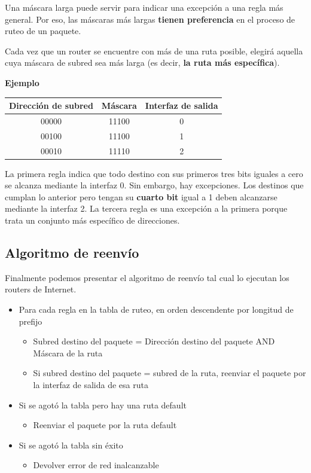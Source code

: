 \documentclass[spanish,a4paper,]{article}
\providecommand{\tightlist}{%
  \setlength{\itemsep}{0pt}\setlength{\parskip}{0pt}}
\begin{document}
Una máscara larga puede servir para indicar una excepción a una regla
más general. Por eso, las máscaras más largas \textbf{tienen
preferencia} en el proceso de ruteo de un paquete.

Cada vez que un router se encuentre con más de una ruta posible, elegirá
aquella cuya máscara de subred sea más larga (es decir, \textbf{la ruta
más específica}).

\textbf{Ejemplo}

\begin{longtable}[]{@{}ccc@{}}
\toprule
Dirección de subred & Máscara & Interfaz de salida\tabularnewline
\midrule
\endhead
00000 & 11100 & 0\tabularnewline
00100 & 11100 & 1\tabularnewline
00010 & 11110 & 2\tabularnewline
\bottomrule
\end{longtable}

La primera regla indica que todo destino con sus primeros tres bits
iguales a cero se alcanza mediante la interfaz 0. Sin embargo, hay
excepciones. Los destinos que cumplan lo anterior pero tengan su
\textbf{cuarto bit} igual a 1 deben alcanzarse mediante la interfaz 2.
La tercera regla es una excepción a la primera porque trata un conjunto
más específico de direcciones.

\hypertarget{algoritmo-de-reenvuxedo}{%
\subsection{Algoritmo de reenvío}\label{algoritmo-de-reenvuxedo}}

Finalmente podemos presentar el algoritmo de reenvío tal cual lo
ejecutan los routers de Internet.

\begin{itemize}
\tightlist
\item
  Para cada regla en la tabla de ruteo, en orden descendente por
  longitud de prefijo

  \begin{itemize}
  \tightlist
  \item
    Subred destino del paquete = Dirección destino del paquete AND
    Máscara de la ruta
  \item
    Si subred destino del paquete = subred de la ruta, reenviar el
    paquete por la interfaz de salida de esa ruta
  \end{itemize}
\item
  Si se agotó la tabla pero hay una ruta default

  \begin{itemize}
  \tightlist
  \item
    Reenviar el paquete por la ruta default
  \end{itemize}
\item
  Si se agotó la tabla sin éxito

  \begin{itemize}
  \tightlist
  \item
    Devolver error de red inalcanzable
  \end{itemize}
\end{itemize}
\end{document}
